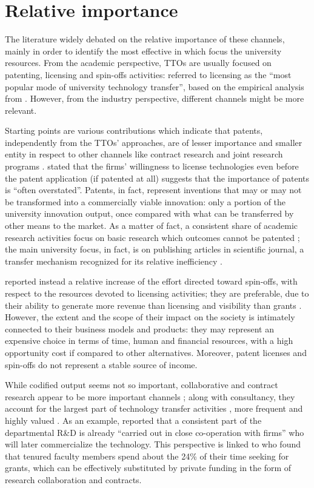 \section{Relative importance}

The literature widely debated on the relative importance of these channels, mainly in order to identify the most effective in which focus the university resources. From the academic perspective, TTOs are usually focused on patenting, licensing and spin-offs activities: \citet{Chapple2005} referred to licensing as the \enquote{most popular mode of university technology transfer}, based on the empirical analysis from \citet{Siegel2003}. However, from the industry perspective, different channels might be more relevant.

Starting points are various contributions which indicate that patents, independently from the TTOs' approaches, are of lesser importance and smaller entity in respect to other channels like contract research and joint research programs \citep{DEste2007}. \citet{Link2005} stated that the firms' willingness to license technologies even before the patent application (if patented at all) suggests that the importance of patents is \enquote{often overstated}. Patents, in fact, represent inventions that may or may not be transformed into a commercially viable innovation: only a portion of the university innovation output, once compared with what can be transferred by other means to the market. As a matter of fact, a consistent share of academic research activities focus on basic research which outcomes cannot be patented \citep{Fritsch2007}; the main university focus, in fact, is  on publishing articles in scientific journal, a transfer mechanism recognized for its relative inefficiency \citep{Rogers2001}. 

\citet{Balderi2007} reported instead a relative increase of the effort directed toward spin-offs, with respect to the resources devoted to licensing activities; they are preferable, due to their ability to generate more revenue than licensing and visibility than grants \citep{Rasmussen2006}. However, the extent and the scope of their impact on the society is intimately connected to their business models and products: they may represent an expensive choice in terms of time, human and financial resources, with a high opportunity cost if compared to other alternatives. Moreover, patent licenses and spin-offs do not represent a stable source of income. 

While codified output seems not so important, collaborative and contract research appear to be more important channels \citep{Bekkers2008}; along with consultancy, they account for the largest part of technology transfer activities \citep{Muscio2010}, more frequent and highly valued \citep{DEste2011}. As an example, \citet{Rasmussen2006} reported that a consistent part of the departmental R\&D is already \enquote{carried out in close co-operation with firms} who will later commercialize the technology. This perspective is linked to \citet{Link2007} who found that tenured faculty members spend about the 24\% of their time seeking for grants, which can be effectively substituted by private funding in the form of research collaboration and contracts. 

